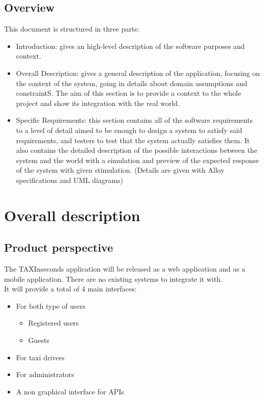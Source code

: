 \documentclass{article}
\begin{document}
\subsection{Overview}
This document is structured in three parts:
\begin{itemize}
	\item Introduction: gives an high-level description of the software purposes and context.
	\item Overall Description: gives a general description of the application, focusing on the context of the system, going in details about domain assumptions and constraintS. The aim of this section is to provide a context to the whole project and show its integration with the real world.
	\item Specific Requirements: this section contains all of the software requirements to a level of detail aimed to be enough to design a system to satisfy said requirements, and testers to test that the system actually satisfies them. It also contains the detailed description of the possible interactions between the system and the world with a simulation and preview of the expected response of the system with given stimulation. (Details are given with Alloy specifications and UML diagrams)
\end{itemize}


\section{Overall description}
\subsection{Product perspective}
The TAXInseconds application will be released as a web application and as a mobile application. 
There are no existing systems to integrate it with. 
\\It will provide a total of 4 main interfaces:
\begin{itemize}
	\item For both type of users
		\begin{itemize}
			\item Registered users
			\item Guests
		\end{itemize}
	\item For taxi drivers 
	\item For administrators
	\item A non graphical interface for APIs 
\end{itemize}
\end{document}
